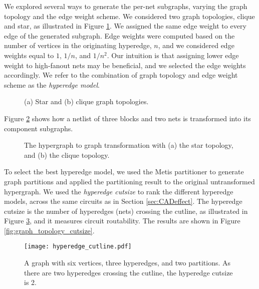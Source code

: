 We explored several ways to generate the per-net subgraphs, varying the graph topology and the edge weight scheme. We considered two graph topologies, clique and star, as illustrated in Figure \ref{fig:star_clique}. We assigned the same edge weight to every edge of the generated subgraph. Edge weights were computed based on the number of vertices in the originating hyperedge, $n$, and we considered edge weights equal to $1$, $1/n$, and $1/n^2$.  Our intuition is that assigning lower edge weight to high-fanout nets may be beneficial, and we selected the edge weights accordingly. We refer to the combination of graph topology and edge weight scheme as the \emph{hyperedge model}.

\begin{figure}[!htbp]
\centering
{}
\caption{(a) Star and (b) clique graph topologies.}
\label{fig:star_clique}
\end{figure}



Figure \ref{fig:hyperedge_to_graph} shows how a netlist of three blocks and two nets is transformed into its component subgraphs.

\begin{figure}[!htbp]
\centering
{}
\caption{The hypergraph to graph transformation with (a) the star topology, and (b) the clique topology.}
\label{fig:hyperedge_to_graph}
\end{figure}

To select the best hyperedge model, we used the Metis partitioner to generate graph partitions and applied the partitioning result to the original untransformed hypergraph. We used the \emph{hyperedge cutsize} to rank the different hyperedge models, across the same circuits as in Section \ref{sec:CADeffect}. The hyperedge cutsize is the number of hyperedges (nets) crossing the cutline, as illustrated in Figure \ref{fig:hyperedge_cutline}, and it measures circuit routability. The results are shown in Figure \ref{fig:graph_topology_cutsize}.

\begin{figure}[!htbp]
\centering
\texttt{[image: hyperedge\_cutline.pdf]}
\caption{A graph with six vertices, three hyperedges, and two partitions. As there are two hyperedges crossing the cutline, the hyperedge cutsize is 2.}
\label{fig:hyperedge_cutline}
\end{figure}

